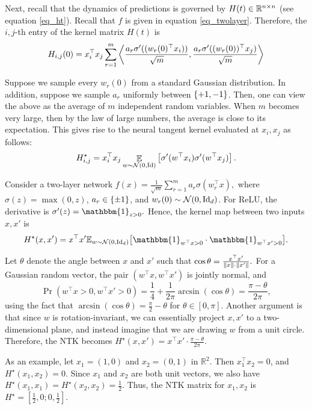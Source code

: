 Next, %
recall that the dynamics of predictions is governed by $H(t) \in \mathbb{R}^{n \times n}$ (see equation \eqref{eq_ht}).
Recall that $f$ is given in equation \eqref{eq_twolayer}.
Therefore, the $i, j$-th entry of the kernel matrix $H(t)$ is
\[ H_{i, j}(0) = x_i^{\top} x_j \sum_{r = 1}^m \left\langle \frac {a_r \sigma'((w_r(0)^{\top} x_i) )} {\sqrt m},  \frac {a_r \sigma'( (w_r(0))^{\top} x_j )} {\sqrt m}  \right\rangle  \]

Suppose we sample every $w_r(0)$ from a standard Gaussian distribution.
In addition, suppose we sample $a_r$ uniformly between $\left\{+1, -1\right\}$.
Then, one can view the above as the average of $m$ independent random variables.
When $m$ becomes very large, then by the law of large numbers, the average is close to its expectation.
This gives rise to the neural tangent kernel evaluated at $x_i, x_j$ as follows:
\begin{align} \label{eq_ntk_two} H^{\star}_{i, j} = x_i^{\top} x_j \mathop{\mathbb{E}}_{ w \sim \mathcal{N}(0, \operatorname{Id})  }\left[  \sigma'(w^{\top} x_i) \sigma'(w^{\top} x_j)  \right]. \end{align}

\begin{example}
    Consider a two-layer network $f(x) = \frac{1}{\sqrt{m}} \sum_{r=1}^m a_r \sigma(w_r^\top x),$
    where $\sigma(z)=\max(0,z)$, $a_r \in \left\{\pm1\right\}$, and $w_r(0) \sim \mathcal{N}(0, \operatorname{Id}_d)$. For ReLU, the derivative is $\sigma'(z) = \mathbbm{1}_{z > 0}.$
    Hence, the kernel map between two inputs $x, x'$ is
    \[ H^\star(x,x') = x^\top x' \mathbb{E}_{w \sim \mathcal{N}(0, \id_d)} \big[ \mathbbm{1}_{w^\top x > 0} \cdot \mathbbm{1}_{w^\top x' > 0} \big]. \]

    Let $\theta$ denote the angle between $x$ and $x'$ such that $\cos \theta = \frac{x^\top x'}{\left\| x \right\|\cdot \left\| x' \right\|}.$
    For a Gaussian random vector, the pair $(w^\top x, w^\top x')$ is jointly normal, and
    \[ \Pr(w^\top x > 0, w^\top x' > 0) = \frac14 + \frac{1}{2\pi}\arcsin(\cos\theta) = \frac{\pi - \theta}{2\pi}, \]
    using the fact that $\arcsin(\cos\theta)=\frac{\pi}{2}-\theta$ for  $\theta\in[0,\pi]$.
    Another argument is that since $w$ is rotation-invariant, we can essentially project $x, x'$ to a two-dimensional plane, and instead imagine that we are drawing $w$ from a unit circle.
    Therefore, the NTK becomes
    $H^\star(x,x') = x^{\top}x' \cdot \frac{\pi - \theta}{2\pi}.$

    As an example, let $x_1=(1,0)$ and $x_2=(0,1)$ in $\mathbb{R}^2$. 
    Then $x_1^\top x_2 = 0$,  and $H^\star(x_1,x_2) = 0.$ 
    Since $x_1$ and $x_2$ are both unit vectors, we also have $H^\star(x_1,x_1)=H^\star(x_2,x_2) = \frac{1}{2}.$
    Thus, the NTK matrix for ${x_1,x_2}$ is $H^\star = [\frac{1}{2}, 0; 0, \frac{1}{2}].$
\end{example}

